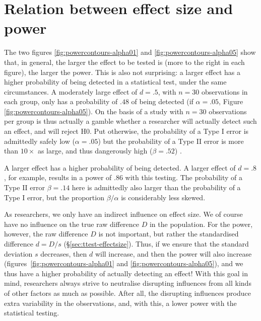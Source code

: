 \documentclass[
]{book}
\begin{document}
\hypertarget{sec:effectsize-power}{%
\section{Relation between effect size and power}\label{sec:effectsize-power}}

The two figures \ref{fig:powercontours-alpha01} and
\ref{fig:powercontours-alpha05} show that, in general, the larger the effect to be
tested is (more to the right in each figure), the larger the power.
This is also not surprising: a larger effect has
a higher probability of being detected in a statistical test, under
the same circumstances. A moderately large effect of
\(d=.5\), with \(n=30\) observations in each group, only has a probability
of \(.48\) of being detected (if \(\alpha=.05\), Figure \ref{fig:powercontours-alpha05}). On the basis
of a study
with \(n=30\) observations per group is thus actually a gamble
whether a researcher will actually detect such an effect, and
will reject H0. Put otherwise, the probability of a Type I error is
admittedly safely low (\(\alpha=.05\)) but the probability of a Type II error is
more than \(10\times\) as large, and thus dangerously high (\(\beta=.52\)) \citep[Ch.12]{Rose08}.

A larger effect has a higher probability of being detected. A larger
effect of \(d=.8\), for example, results in a power of
\(.86\) with this testing. The probability of a Type II error \(\beta=.14\) here is
admittedly also larger than the probability of a Type I error, but the
proportion \(\beta/\alpha\) is considerably less skewed.

As researchers, we only have an indirect influence on effect size.
We of course have no influence on the true raw difference \(D\) in the
population. For the power, however, the raw difference \(D\) is not
important, but rather the standardised difference \(d=D/s\)
(§\ref{sec:ttest-effectsize}). Thus, if we ensure that the standard
deviation \(s\) decreases, then \(d\) will increase,
and then the power will also increase
(figures~\ref{fig:powercontours-alpha01} and \ref{fig:powercontours-alpha05}),
and we thus have a higher probability
of actually detecting an effect!
With this goal in mind, researchers always strive to neutralise
disrupting influences from all kinds of other factors as much as possible.
After all, the disrupting influences produce extra variability in the observations, and,
with this, a lower power with the statistical testing.
\end{document}
